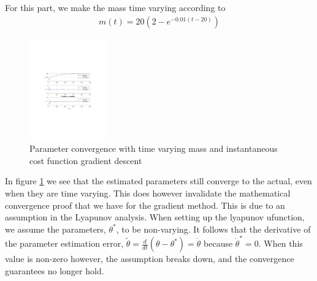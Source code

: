 \documentclass[]{article}
\begin{document}
\subsection{}
For this part, we make the mass time varying according to
\begin{equation}\begin{aligned}
m(t) = 20(2 - e^{-0.01(t-20)})
\end{aligned}\end{equation}
\begin{figure}[H]
\centering
\includegraphics[width=0.3\textwidth, trim={8cm 8cm 8cm 8cm, clip}]{time_var_m}
\caption{Parameter convergence with time varying mass and instantaneous cost function gradient descent}
\label{fig:time_var_m}
\end{figure}
In figure \ref{fig:time_var_m} we see that the estimated parameters still converge to the actual, even when they are time varying. This does however invalidate the mathematical convergence proof that we have for the gradient method. This is due to an assumption in the Lyapunov analysis. When setting up the lyapunov ufunction, we assume the parameters, $\theta^{*}$, to be non-varying. It follows that the derivative of the parameter estimation error, $\tilde \theta = \frac{d}{dt}(\theta - \theta^*) = \dot \theta$ because $\dot \theta^* = 0$. When this value is non-zero however, the assumption breaks down, and the convergence guarantees no longer hold.
\end{document}
